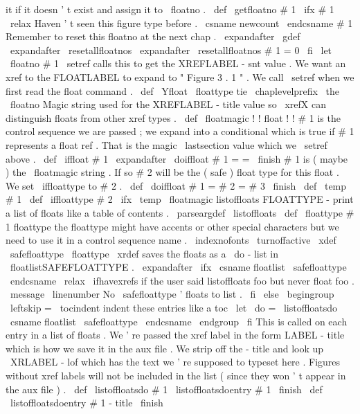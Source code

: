 {{{{it
if
it
doesn
'
t
exist
and
assign
it
to
\
floatno
.
\
def
\
getfloatno
#
1
{
%
\
ifx
#
1
\
relax
%
Haven
'
t
seen
this
figure
type
before
.
\
csname
newcount
\
endcsname
#
1
%
%
%
Remember
to
reset
this
floatno
at
the
next
chap
.
\
expandafter
\
gdef
\
expandafter
\
resetallfloatnos
\
expandafter
{
\
resetallfloatnos
#
1
=
0
}
%
\
fi
\
let
\
floatno
#
1
%
}
%
\
setref
calls
this
to
get
the
XREFLABEL
-
snt
value
.
We
want
an
xref
%
to
the
FLOATLABEL
to
expand
to
"
Figure
3
.
1
"
.
We
call
\
setref
when
we
%
first
read
the
float
command
.
%
\
def
\
Yfloat
{
\
floattype
tie
\
chaplevelprefix
\
the
\
floatno
}
%
%
Magic
string
used
for
the
XREFLABEL
-
title
value
so
\
xrefX
can
%
distinguish
floats
from
other
xref
types
.
\
def
\
floatmagic
{
!
!
float
!
!
}
%
#
1
is
the
control
sequence
we
are
passed
;
we
expand
into
a
conditional
%
which
is
true
if
#
1
represents
a
float
ref
.
That
is
the
magic
%
\
lastsection
value
which
we
\
setref
above
.
%
\
def
\
iffloat
#
1
{
\
expandafter
\
doiffloat
#
1
=
=
\
finish
}
%
%
#
1
is
(
maybe
)
the
\
floatmagic
string
.
If
so
#
2
will
be
the
%
(
safe
)
float
type
for
this
float
.
We
set
\
iffloattype
to
#
2
.
%
\
def
\
doiffloat
#
1
=
#
2
=
#
3
\
finish
{
%
\
def
\
temp
{
#
1
}
%
\
def
\
iffloattype
{
#
2
}
%
\
ifx
\
temp
\
floatmagic
}
%
listoffloats
FLOATTYPE
-
print
a
list
of
floats
like
a
table
of
contents
.
%
\
parseargdef
\
listoffloats
{
%
\
def
\
floattype
{
#
1
}
%
floattype
{
%
%
the
floattype
might
have
accents
or
other
special
characters
%
but
we
need
to
use
it
in
a
control
sequence
name
.
\
indexnofonts
\
turnoffactive
\
xdef
\
safefloattype
{
\
floattype
}
%
}
%
%
%
\
xrdef
saves
the
floats
as
a
\
do
-
list
in
\
floatlistSAFEFLOATTYPE
.
\
expandafter
\
ifx
\
csname
floatlist
\
safefloattype
\
endcsname
\
relax
\
ifhavexrefs
%
if
the
user
said
listoffloats
foo
but
never
float
foo
.
\
message
{
\
linenumber
No
\
safefloattype
'
floats
to
list
.
}
%
\
fi
\
else
\
begingroup
\
leftskip
=
\
tocindent
%
indent
these
entries
like
a
toc
\
let
\
do
=
\
listoffloatsdo
\
csname
floatlist
\
safefloattype
\
endcsname
\
endgroup
\
fi
}
%
This
is
called
on
each
entry
in
a
list
of
floats
.
We
'
re
passed
the
%
xref
label
in
the
form
LABEL
-
title
which
is
how
we
save
it
in
the
%
aux
file
.
We
strip
off
the
-
title
and
look
up
\
XRLABEL
-
lof
which
%
has
the
text
we
'
re
supposed
to
typeset
here
.
%
%
Figures
without
xref
labels
will
not
be
included
in
the
list
(
since
%
they
won
'
t
appear
in
the
aux
file
)
.
%
\
def
\
listoffloatsdo
#
1
{
\
listoffloatsdoentry
#
1
\
finish
}
\
def
\
listoffloatsdoentry
#
1
-
title
\
finish
}}}}
